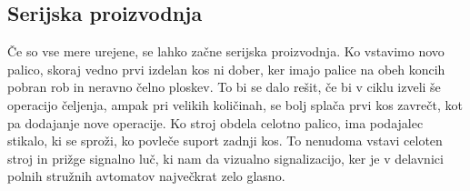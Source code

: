 \subsection{Serijska proizvodnja}
Če so vse mere urejene, se lahko začne serijska proizvodnja. Ko vstavimo novo palico, skoraj vedno prvi izdelan kos ni dober, ker imajo palice na obeh koncih pobran rob in neravno čelno ploskev. To bi se dalo rešit, če bi v ciklu izveli še operacijo čeljenja, ampak pri velikih količinah, se bolj splača prvi kos zavrečt, kot pa dodajanje nove operacije.
Ko stroj obdela celotno palico, ima podajalec stikalo, ki se sproži, ko povleče suport zadnji kos. To nenudoma vstavi celoten stroj in prižge signalno luč, ki nam da vizualno signalizacijo, ker je v delavnici polnih stružnih avtomatov največkrat zelo glasno. 